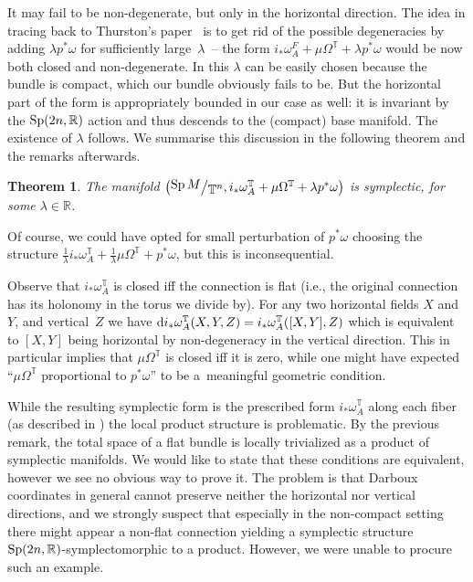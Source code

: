 \documentclass[pdftex]{sigma}
\numberwithin{equation}{section}
\newtheorem{Theorem}{Theorem}[section]
{ \theoremstyle{definition}
\newtheorem{Definition}[Theorem]{Definition}
\newtheorem{Example}[Theorem]{Example}
\newtheorem{Remark}[Theorem]{Remark} }
\newcommand{\bigslant}[2]{{\raisebox{.2em}{$#1$}\big/\raisebox{-.2em}{$#2$}}}
\begin{document}
It may fail to be non-degenerate, but only in the horizontal direction. The idea in \cite{fat} tracing back to Thurston's paper~\cite{thurston} is to get rid of the possible degeneracies by adding $\lambda p^*\omega$ for sufficiently large~$\lambda$~-- the form $i_*\omega^F_A + \mu\Omega^{\mathbb{T}} + \lambda p^*\omega$ would be now both closed and non-degenerate. In \cite{fat} this $\lambda$ can be easily chosen because the bundle is compact, which our bundle obviously fails to be. But the horizontal part of the form is appropriately bounded in our case as well: it is invariant by the ${\rm Sp}(2n,\mathbb{R})$ action and thus descends to the (compact) base manifold. The existence of $\lambda$ follows. We summarise this discussion in the following theorem and the remarks afterwards.
\begin{Theorem} \label{main2}
The manifold $\big(\bigslant{\operatorname{Sp} M}{\mathbb{T}^n},i_*\omega^{\mathbb{T}}_A + \mu\Omega^{\mathbb{T}} + \lambda p^*\omega\big)$ is symplectic, for some $\lambda\in\mathbb{R}$.
\end{Theorem}
Of course, we could have opted for small perturbation of $p^*\omega$ choosing the structure $\frac{1}{\lambda}i_*\omega^{\mathbb{T}}_A + \frac{1}{\lambda}\mu\Omega^{\mathbb{T}} + p^*\omega$, but this is inconsequential.
\begin{Remark}\label{dodac}
Observe that $i_*\omega^{\mathbb{T}}_A$ is closed iff the connection is flat (i.e., the original connection has its holonomy in the torus we divide by). For any two horizontal fields $X$ and $Y$, and vertical~$Z$ we have ${\rm d}i_*\omega^{\mathbb{T}}_A(X,Y,Z)=i_*\omega^{\mathbb{T}}_A([X,Y],Z)$ which is equivalent to $[X,Y]$ being horizontal by non-degeneracy in the vertical direction. This in particular implies that $\mu\Omega^{\mathbb{T}}$ is closed iff it is zero, while one might have expected ``$\mu\Omega^{\mathbb{T}}$ proportional to $p^*\omega$'' to be a~meaningful geometric condition.
\end{Remark}
\begin{Remark}\label{dodacdwa}
While the resulting symplectic form is the prescribed form $i_*\omega^{\mathbb{T}}_A$ along each fiber (as described in \cite{fat}) the local product structure is problematic. By the previous remark, the total space of a flat bundle is locally trivialized as a product of symplectic manifolds. We would like to state that these conditions are equivalent, however we see no obvious way to prove it. The problem is that Darboux coordinates in general cannot preserve neither the horizontal nor vertical directions, and we strongly suspect that especially in the non-compact setting there might appear a non-flat connection yielding a symplectic structure ${\rm Sp}(2n,\mathbb{R})$-symplectomorphic to a product. However, we were unable to procure such an example.
\end{Remark}
\end{document}
